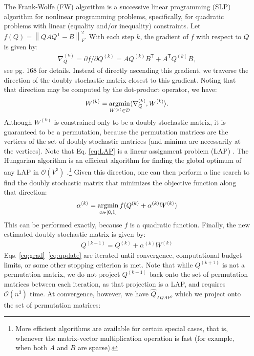\documentclass{article} %
\providecommand{\norm}[1]{\left \lVert#1 \right  \rVert}
\newcommand{\argmin}{\operatornamewithlimits{argmin}}
\newcommand{\T}{^{\ensuremath{\mathsf{T}}}}           %
\providecommand{\mc}[1]{\mathcal{#1}}
\providecommand{\mh}[1]{\hat{#1}}
\begin{document}
The Frank-Wolfe (FW) algorithm is a successive linear programming (SLP) \cite{} algorithm for nonlinear programming problems, specifically, for quadratic problems with linear (equality and/or inequality) constraints. Let $f(Q)=\norm{QAQ\T-B}_F^2$.  With each step $k$, the gradient of $f$ with respect to $Q$ is given by:
\begin{align} \label{eq:grad}
	\nabla_Q^{(k)} = \partial f / \partial Q^{(k)} =  A Q^{(k)} B\T + A\T Q^{(k)} B, 
\end{align}
see \cite{MDS} pg. 168 for details. Instead of directly ascending this gradient, we traverse the direction of the doubly stochastic matrix closest to this gradient. Noting that that direction may be computed by the dot-product operator, we have:
\begin{align}\label{eq:LAP}
	W^{(k)} = \argmin_{W^{(k)} \in \mc{D}} \langle \nabla_Q^{(k)},W^{(k)} \rangle. %
\end{align}
Although $W^{(k)}$ is constrained only to be a doubly stochastic matrix, it is guaranteed to be a permutation, because the permutation matrices are the vertices of the set of doubly stochastic matrices (and minima are necessarily at the vertices).  Note that Eq. \eqref{eq:LAP} is a linear assignment problem (LAP) \cite{}.  The Hungarian algorithm is an efficient algorithm for finding the global optimum of any LAP in $\mc{O}(V^3)$ \cite{}.\footnote{More efficient algorithms are available for certain special cases, that is, whenever the matrix-vector multiplication operation is fast (for example, when both $A$ and $B$ are sparse).} Given this direction, one can then perform a line search to find the doubly stochastic matrix that minimizes the objective function along that direction:
\begin{align}
	\alpha^{(k)} = \argmin_{\alpha \in [0,1]} f(Q^{(k)} + \alpha^{(k)} W^{(k)})
\end{align}
This can be performed exactly, because $f$ is a quadratic function.  Finally, the new estimated doubly stochastic matrix is given by:
\begin{align}\label{eq:update}
	Q^{(k+1)} = Q^{(k)} + \alpha^{(k)} W^{(k)}
\end{align}
Eqs. \eqref{eq:grad}--\eqref{eq:update} are iterated until convergence, computational budget limits, or some other stopping criterion is met.  Note that while $Q^{(k+1)}$ is not a permutation matrix, we do not project $Q^{(k+1)}$ back onto the set of permutation matrices between each iteration, as that projection is a LAP, and requires $\mc{O}(n^3)$ time. At convergence, however, we have $\mh{Q}_{AQAP}$, which we project onto the set of permutation matrices:
\end{document}
